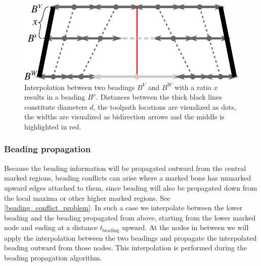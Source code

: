 \begin{figure}
\centering
\includegraphics[width=.8\columnwidth]{sources/method/beading_interpolation_v2.pdf}
\caption{
Interpolation between two beadings $B^V$ and $B^W$ with a ratio $x$ results in a beading $B^x$.
Distances between the thick black lines constitute diameters $d$,
the toolpath locations are visualized as dots,
the widths are visualized as bidirection arrows
and the middle is highlighted in red.
}
\label{beading_interpolation}
\end{figure}


\subsubsection{Beading propagation}\label{section_beading_conflicts}
Because the beading information will be propagated outward from the central marked regions, beading conflicts can arise where a marked bone has unmarked upward edges attached to them, since beading will also be propagated down from the local maxima or other higher marked regions.
See \cref{beading_conflict_problem}.
In such a case we interpolate between the lower beading and the beading propagated from above,
starting from the lower marked node and ending at a distance $t_\text{beading}$ upward.
At the nodes in between we will apply the interpolation between the two beadings and propagate the interpolated beading outward from those nodes.
This interpolation is performed during the beading propagation algorithm.


